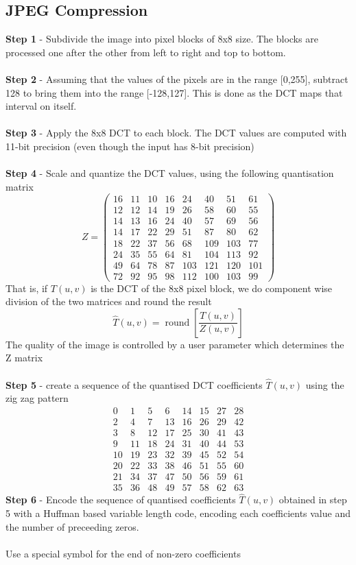 \documentclass{article}[18pt]
\begin{document}
\subsection{JPEG Compression}
\textbf{Step 1} - Subdivide the image into pixel blocks of 8x8 size. The blocks are processed one after the other from left to right and top to bottom.\\
\\
\textbf{Step 2} - Assuming that the values of the pixels are in the range [0,255], subtract 128 to bring them into the range [-128,127]. This is done as the DCT maps that interval on itself.\\
\\
\textbf{Step 3} - Apply the 8x8 DCT to each block. The DCT values are computed with 11-bit precision (even though the input has 8-bit precision)\\
\\
\textbf{Step 4} - Scale and quantize the DCT values, using the following quantisation matrix
$$Z=\left(\begin{array}{cccccccc}
16 & 11 & 10 & 16 & 24 & 40 & 51 & 61 \\
12 & 12 & 14 & 19 & 26 & 58 & 60 & 55 \\
14 & 13 & 16 & 24 & 40 & 57 & 69 & 56 \\
14 & 17 & 22 & 29 & 51 & 87 & 80 & 62 \\
18 & 22 & 37 & 56 & 68 & 109 & 103 & 77 \\
24 & 35 & 55 & 64 & 81 & 104 & 113 & 92 \\
49 & 64 & 78 & 87 & 103 & 121 & 120 & 101 \\
72 & 92 & 95 & 98 & 112 & 100 & 103 & 99
\end{array}\right)$$
That is, if $T(u,v)$ is the DCT of the 8x8 pixel block, we do component wise division of the two matrices and round the result
$$\hat{T}(u, v)=\operatorname{round}\left[\frac{T(u, v)}{Z(u, v)}\right]$$
The quality of the image is controlled by a user parameter which determines the Z matrix\\
\\
\textbf{Step 5} - create a sequence of the quantised DCT coefficients $\hat{T}(u,v)$ using the zig zag pattern
$$\begin{array}{cccccccc}
0 & 1 & 5 & 6 & 14 & 15 & 27 & 28 \\
2 & 4 & 7 & 13 & 16 & 26 & 29 & 42 \\
3 & 8 & 12 & 17 & 25 & 30 & 41 & 43 \\
9 & 11 & 18 & 24 & 31 & 40 & 44 & 53 \\
10 & 19 & 23 & 32 & 39 & 45 & 52 & 54 \\
20 & 22 & 33 & 38 & 46 & 51 & 55 & 60 \\
21 & 34 & 37 & 47 & 50 & 56 & 59 & 61 \\
35 & 36 & 48 & 49 & 57 & 58 & 62 & 63
\end{array}$$
\textbf{Step 6} - Encode the sequence of quantised coefficients $\hat{T}(u,v)$ obtained in step 5 with a Huffman based variable length code, encoding each coefficients value and the number of preceeding zeros.\\
\\
Use a special symbol for the end of non-zero coefficients
\end{document}
